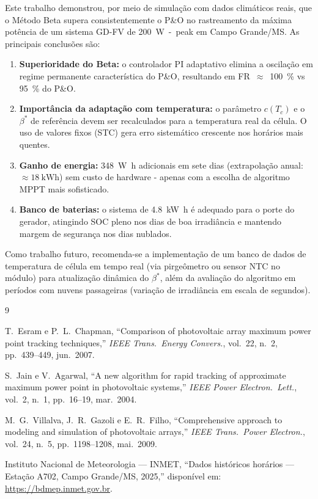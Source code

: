 \documentclass[11pt,a4paper]{article}
\begin{document}
Este trabalho demonstrou, por meio de simulação com dados climáticos reais, que o
Método Beta supera consistentemente o P\&O no rastreamento da máxima potência de
um sistema GD-FV de \SI{200}{\watt-peak} em Campo Grande/MS. As principais
conclusões são:

\begin{enumerate}
  \item \textbf{Superioridade do Beta:} o controlador PI adaptativo elimina a
        oscilação em regime permanente característica do P\&O, resultando em
        FR~$\approx$~\SI{100}{\percent} vs \SI{95}{\percent} do P\&O.

  \item \textbf{Importância da adaptação com temperatura:} o parâmetro
        $c(T_c)$ e o $\beta^*$ de referência devem ser recalculados para a
        temperatura real da célula. O uso de valores fixos (STC) gera erro
        sistemático crescente nos horários mais quentes.

  \item \textbf{Ganho de energia:} \SI{348}{\watt\hour} adicionais em sete dias
        (extrapolação anual: $\approx\SI{18}{\kilo\watt\hour}$) sem custo de
        hardware - apenas com a escolha de algoritmo MPPT mais sofisticado.

  \item \textbf{Banco de baterias:} o sistema de \SI{4,8}{\kilo\watt\hour} é
        adequado para o porte do gerador, atingindo SOC pleno nos dias de boa
        irradiância e mantendo margem de segurança nos dias nublados.
\end{enumerate}

Como trabalho futuro, recomenda-se a implementação de um banco de dados de
temperatura de célula em tempo real (via pirgeômetro ou sensor NTC no módulo)
para atualização dinâmica do $\beta^*$, além da avaliação do algoritmo em
períodos com nuvens passageiras (variação de irradiância em escala de segundos).

\begin{thebibliography}{9}

T.~Esram e P.~L.~Chapman,
``Comparison of photovoltaic array maximum power point tracking techniques,''
\textit{IEEE Trans.\ Energy Convers.}, vol.~22, n.~2, pp.~439--449, jun.~2007.

S.~Jain e V.~Agarwal,
``A new algorithm for rapid tracking of approximate maximum power point in
photovoltaic systems,''
\textit{IEEE Power Electron.\ Lett.}, vol.~2, n.~1, pp.~16--19, mar.~2004.

M.~G.~Villalva, J.~R.~Gazoli e E.~R.~Filho,
``Comprehensive approach to modeling and simulation of photovoltaic arrays,''
\textit{IEEE Trans.\ Power Electron.}, vol.~24, n.~5, pp.~1198--1208, mai.~2009.

Instituto Nacional de Meteorologia --- INMET,
``Dados históricos horários --- Estação A702, Campo Grande/MS, 2025,''
disponível em: \url{https://bdmep.inmet.gov.br}.

\end{thebibliography}
\end{document}
